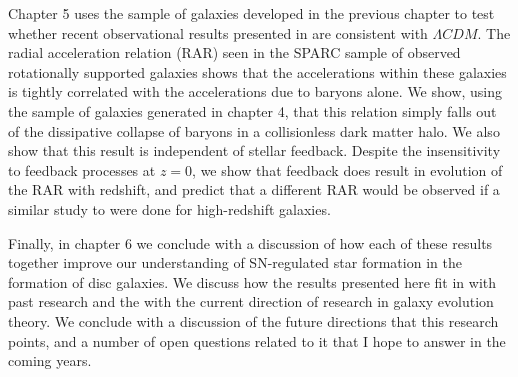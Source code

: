 Chapter 5 uses the sample of galaxies developed in the previous chapter to
test whether recent observational results presented in \citet{McGaugh2016}
are consistent with $\Lambda CDM$.  The radial acceleration relation (RAR) seen in
the SPARC sample \citep{Lelli2016} of observed rotationally supported galaxies
shows that the accelerations within these galaxies is tightly correlated 
with the accelerations due to baryons alone.  We show, using the sample of
galaxies generated in chapter 4, that this relation simply falls out of the
dissipative collapse of baryons in a collisionless dark matter halo.  We also
show that this result is independent of stellar feedback.  Despite the insensitivity
to feedback processes at $z=0$, we show that feedback does result in evolution
of the RAR with redshift, and predict that a different RAR would be observed if
a similar study to \citet{Lelli2016} were done for high-redshift galaxies.

Finally, in chapter 6 we conclude with a discussion of how each of these results
together improve our understanding of SN-regulated star formation
in the formation of disc galaxies.  We discuss how the results presented here
fit in with past research and the with the current direction of research in
galaxy evolution theory.  We conclude with a discussion of the future directions
that this research points, and a number of open questions related to it that I
hope to answer in the coming years.



